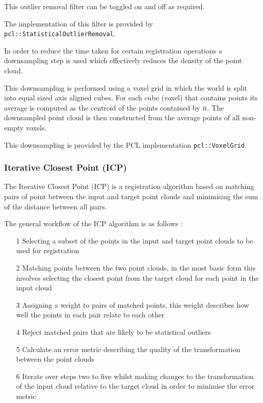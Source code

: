 \documentclass{entcs}
\begin{document}
This outlier removal filter can be toggled on and off as required.

The implementation of this filter is provided by
\texttt{pcl::StatisticalOutlierRemoval}.

In order to reduce the time taken for certain registration operations a
downsampling step is used which effectively reduces the density of the point
cloud.

This downsampling is performed using a voxel grid in which the world is split
into equal sized axis aligned cubes. For each cube (voxel) that contains points
its average is computed as the centroid of the points contained by it. The
downsampled point cloud is then constructed from the average points of all
non-empty voxels.

This downsampling is provided by the PCL implementation \texttt{pcl::VoxelGrid}.

\subsubsection{Iterative Closest Point (ICP)}

The Iterative Closest Point (ICP) \cite{Besl1992} is a registration algorithm
based on matching pairs of point between the input and target point clouds and
minimising the sum of the distance between all pairs.

The general workflow of the ICP algorithm is as follows \cite{Rusinkiewicz2001}:
\begin{enumerate}
  \item[1]
    Selecting a subset of the points in the input and target point clouds to be
    used for registration

  \item[2]
    Matching points between the two point clouds, in the most basic form this
    involves selecting the closest point from the target cloud for each point in
    the input cloud

  \item[3]
    Assigning a weight to pairs of matched points, this weight describes how
    well the points in each pair relate to each other

  \item[4]
    Reject matched pairs that are likely to be statistical outliers

  \item[5]
    Calculate an error metric describing the quality of the transformation
    between the point clouds

  \item[6]
    Iterate over steps two to five whilst making changes to the transformation
    of the input cloud relative to the target cloud in order to minimise the
    error metric

\end{enumerate}
\end{document}
